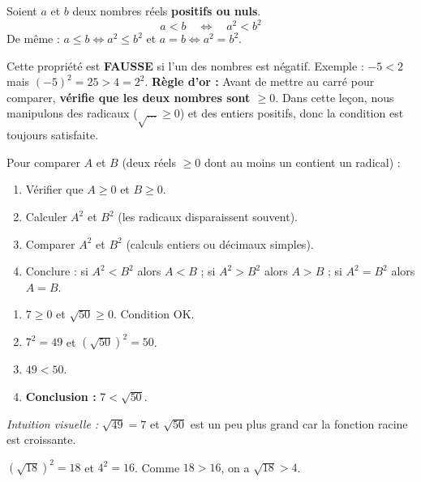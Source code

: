 \documentclass[11pt]{article}
\begin{document}
\begin{propriete}
Soient $a$ et $b$ deux nombres réels \textbf{positifs ou nuls}.
\[ \boxed{a < b \quad \Longleftrightarrow \quad a^2 < b^2} \]
De même : $a \le b \iff a^2 \le b^2$ et $a = b \iff a^2 = b^2$.
\end{propriete}

\begin{attention}
Cette propriété est \textbf{FAUSSE} si l'un des nombres est négatif.
Exemple : $-5 < 2$ mais $(-5)^2 = 25 > 4 = 2^2$.
\textbf{Règle d'or :} Avant de mettre au carré pour comparer, \textbf{vérifie que les deux nombres sont $\ge 0$}. Dans cette leçon, nous manipulons des radicaux ($\sqrt{\dots} \ge 0$) et des entiers positifs, donc la condition est toujours satisfaite.
\end{attention}

\begin{methode}
Pour comparer $A$ et $B$ (deux réels $\ge 0$ dont au moins un contient un radical) :
\begin{enumerate}
    \item Vérifier que $A \ge 0$ et $B \ge 0$.
    \item Calculer $A^2$ et $B^2$ (les radicaux disparaissent souvent).
    \item Comparer $A^2$ et $B^2$ (calculs entiers ou décimaux simples).
    \item Conclure : si $A^2 < B^2$ alors $A < B$ ; si $A^2 > B^2$ alors $A > B$ ; si $A^2 = B^2$ alors $A = B$.
\end{enumerate}
\end{methode}

\begin{exemplebox}
\begin{enumerate}
    \item $7 \ge 0$ et $\sqrt{50} \ge 0$. Condition OK.
    \item $7^2 = 49$ et $(\sqrt{50})^2 = 50$.
    \item $49 < 50$.
    \item \textbf{Conclusion :} $7 < \sqrt{50}$.
\end{enumerate}
\emph{Intuition visuelle :} $\sqrt{49}=7$ et $\sqrt{50}$ est un peu plus grand car la fonction racine est croissante.
\end{exemplebox}

\begin{exemplebox}
$(\sqrt{18})^2 = 18$ et $4^2 = 16$. Comme $18 > 16$, on a $\sqrt{18} > 4$.
\end{exemplebox}
\end{document}
